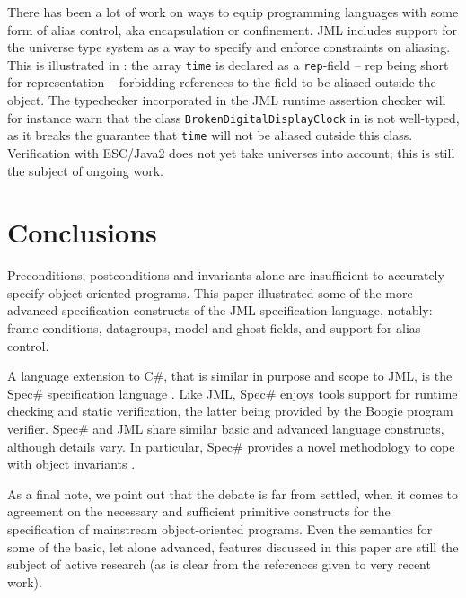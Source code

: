 \documentclass{llncs}
\begin{document}
There has been a lot of work on ways to equip programming languages
with some form of alias control, aka encapsulation or confinement.
JML includes support for the universe type system
\cite{Mueller-Poetzsch-Heffter-Leavens03} as a way to specify
and enforce constraints on aliasing. This is illustrated in 
: the array \texttt{time} is declared
as a \texttt{rep}-field -- rep being short for representation -- forbidding
references to the field to be aliased outside the object.
The typechecker incorporated in the JML runtime assertion checker
will for instance warn that the class \texttt{BrokenDigitalDisplayClock}
in  is not well-typed, as it  breaks 
the guarantee that \texttt{time} will not be aliased outside this class.
Verification with ESC/Java2 does not yet take universes into account;
this is still the subject of ongoing work.

% 
%

\section{Conclusions}
\label{Sec:conclusion}

Preconditions, postconditions and invariants alone are insufficient to
accurately specify object-oriented programs.  This paper illustrated some of
the more advanced specification constructs of the JML specification language,
notably: frame conditions, datagroups, model and
ghost fields, and support for alias control.

A language extension to C\#, that is similar in purpose and scope to JML, is
the Spec\# specification language \cite{SpecSharp}.
%
Like JML, Spec\# enjoys tools support for runtime checking and static
verification, the latter being provided by the Boogie program verifier.
%
Spec\# and JML share similar basic and advanced language constructs, 
although details vary.  In particular, Spec\# provides a novel methodology to 
cope with object invariants \cite{BoogieInvariants}.

As a final note, we point out that the debate is far from settled, when it
comes to agreement on the necessary and sufficient primitive constructs
for the specification of mainstream object-oriented programs.
%
Even the semantics for some of the basic, let alone advanced, features
discussed in this paper are still the subject of active research (as is clear
from the references given to very recent work).



\end{document}
